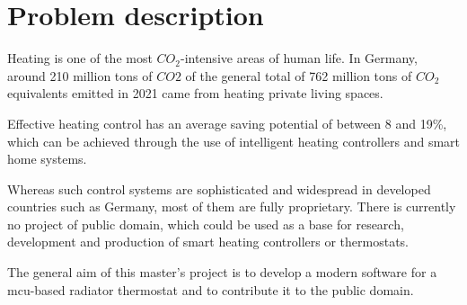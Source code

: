 %
%

\chapter{Problem description}
\label{chap:Introduction}
%
Heating is one of the most $CO_2$-intensive areas of human life. In Germany, around 210 million tons of $CO2$ of the general total of 762 million tons of $CO_2$ equivalents emitted in 2021 came from heating private living spaces. \cite{StatistischesBundesamt.16.07.2025} \cite{Umweltbundesamt.15.03.2022}

Effective heating control has an average saving potential of between 8 and 19\%, which can be achieved through the use of intelligent heating controllers and smart home systems. \cite{Kersken.2018} 

Whereas such control systems are sophisticated and widespread in developed countries such as Germany, most of them are fully proprietary. There is currently no project of public domain, which could be used as a base for research, development and production of smart heating controllers or thermostats.

The general aim of this master's project is to develop a modern software for a \ac{mcu}-based radiator thermostat and to contribute it to the public domain.